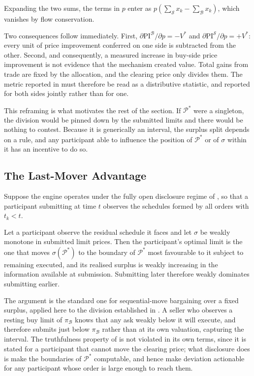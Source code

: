 Expanding the two sums, the terms in $p$ enter as
$p\left(\sum_{\mathcal{S}} x_k - \sum_{\mathcal{B}} x_k\right)$, which
vanishes by flow conservation.


Two consequences follow immediately. First,
$\partial \mathrm{PI}^{\mathcal{B}} / \partial p = -V^{*}$ and
$\partial \mathrm{PI}^{\mathcal{S}} / \partial p = +V^{*}$: every unit of price improvement conferred on
one side is subtracted from the other. Second, and consequently, a
measured increase in buy-side price improvement is not evidence that the
mechanism created value. Total gains from trade are fixed by the
allocation, and the clearing price only divides them. The metric
reported in  must therefore be read as a distributive
statistic, and reported for both sides jointly rather than for one.

This reframing is what motivates the rest of the section. If
$\mathcal{P}^{*}$ were a singleton, the division would be pinned down by
the submitted limits and there would be nothing to contest. Because it
is generically an interval, the surplus split depends on a rule, and any
participant able to influence the position of $\mathcal{P}^{*}$ or of
$\sigma$ within it has an incentive to do so.

\subsection{The Last-Mover Advantage}

Suppose the engine operates under the fully open disclosure regime of
, so that a participant submitting at time $t$
observes the schedules formed by all orders with $t_k < t$.

\begin{proposition}
\label{prop:lastmover}
Let a participant observe the residual schedule it faces and let
$\sigma$ be weakly monotone in submitted limit prices. Then the
participant's optimal limit is the one that moves $\sigma(\mathcal{P}^{*})$
to the boundary of $\mathcal{P}^{*}$ most favourable to it subject to
remaining executed, and its realised surplus is weakly increasing in the
information available at submission. Submitting later therefore weakly
dominates submitting earlier.
\end{proposition}

The argument is the standard one for sequential-move bargaining over a
fixed surplus, applied here to the division established in
. A seller who observes a resting buy limit of
$\pi_{\mathcal{B}}$ knows that any ask weakly below it will execute, and
therefore submits just below $\pi_{\mathcal{B}}$ rather than at its own
valuation, capturing the interval. The truthfulness property of
 is not violated in its own terms, since it is
stated for a participant that cannot move the clearing price; what
disclosure does is make the boundaries of $\mathcal{P}^{*}$ computable,
and hence make deviation actionable for any participant whose order is
large enough to reach them.

